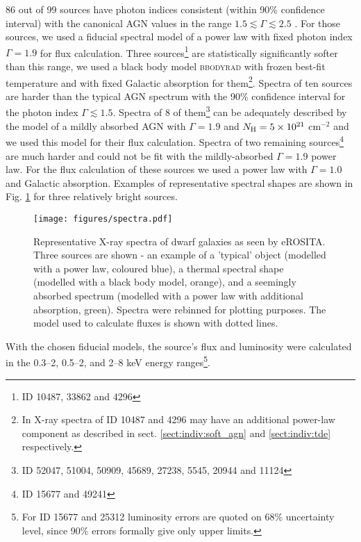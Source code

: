 \documentclass[fleqn,usenatbib]{mnras}
\begin{document}
86 out of 99 sources have photon indices consistent (within 90\% confidence interval) with the canonical AGN values in the range $1.5\lesssim\Gamma\lesssim2.5$ \citep{Ge2022, Liu2022}. For those sources, we used a fiducial spectral model of a power law with fixed photon index $\Gamma = 1.9$ for flux calculation.  Three sources\footnote{ID 10487, 33862 and 4296} are statistically significantly softer than this range, we used a black body model \textsc{bbodyrad} with frozen best-fit temperature and with fixed Galactic absorption for them\footnote{In X-ray spectra of ID 10487 and 4296 may have an additional power-law component as described in sect. \ref{sect:indiv:soft_agn} and \ref{sect:indiv:tde} respectively.}. Spectra of ten sources are harder than the typical AGN spectrum with the 90\% confidence interval for the photon index $\Gamma\lesssim1.5$. Spectra of 8 of them\footnote{ID 52047, 51004, 50909, 45689, 27238, 5545, 20944 and 11124} can be adequately described by the model of a mildly absorbed AGN with $\Gamma=1.9$ and $N_{\rm H}=5\times10^{21}$ cm$^{-2}$ and we used this model for their flux calculation. Spectra of two remaining sources\footnote{ID 15677 and 49241} are much harder and could not be  fit with the mildly-absorbed $\Gamma=1.9$ power law. For the flux calculation of these sources we used a power law with  $\Gamma=1.0$ and Galactic absorption.
Examples of representative spectral shapes are shown in Fig. \ref{fig:spectra} for three relatively bright sources. 


\begin{figure}
    \texttt{[image: figures/spectra.pdf]}
    \caption[Representative X-ray spectra of dwarf galaxies as seen by eROSITA.]{Representative X-ray spectra of dwarf galaxies as seen by eROSITA. Three sources are shown - an example of a 'typical' object (modelled with a power law, coloured blue), a thermal spectral shape (modelled with a black body model, orange), and a seemingly absorbed spectrum (modelled with a power law with additional absorption, green). Spectra were rebinned for plotting purposes.  The model used to calculate fluxes is shown with dotted lines.}
    \label{fig:spectra}
\end{figure}



With the chosen fiducial models, the source's flux and luminosity were calculated in the 0.3--2, 0.5--2, and 2--8 keV energy ranges\footnote{For ID 15677 and 25312 luminosity errors are quoted on 68\% uncertainty level, since 90\% errors formally give only upper limits.}.  
\end{document}
